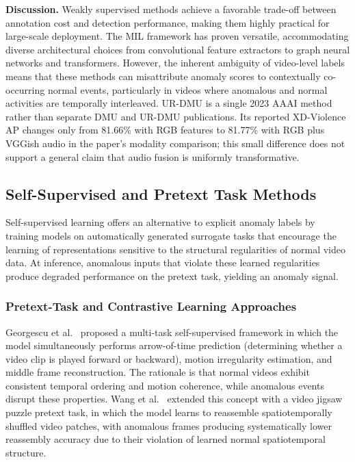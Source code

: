 \documentclass[10pt,a4paper]{article}
\begin{document}
\textbf{Discussion.} Weakly supervised methods achieve a favorable trade-off between annotation cost and detection performance, making them highly practical for large-scale deployment. The MIL framework has proven versatile, accommodating diverse architectural choices from convolutional feature extractors to graph neural networks and transformers. However, the inherent ambiguity of video-level labels means that these methods can misattribute anomaly scores to contextually co-occurring normal events, particularly in videos where anomalous and normal activities are temporally interleaved. UR-DMU is a single 2023 AAAI method rather than separate DMU and UR-DMU publications. Its reported XD-Violence AP changes only from 81.66\% with RGB features to 81.77\% with RGB plus VGGish audio in the paper's modality comparison; this small difference does not support a general claim that audio fusion is uniformly transformative.


\subsection{Self-Supervised and Pretext Task Methods}
\label{subsec:self_supervised}

Self-supervised learning offers an alternative to explicit anomaly labels by training models on automatically generated surrogate tasks that encourage the learning of representations sensitive to the structural regularities of normal video data. At inference, anomalous inputs that violate these learned regularities produce degraded performance on the pretext task, yielding an anomaly signal.

\subsubsection{Pretext-Task and Contrastive Learning Approaches}

Georgescu et al.~\citeyearpar{georgescu2021anomaly} proposed a multi-task self-supervised framework in which the model simultaneously performs arrow-of-time prediction (determining whether a video clip is played forward or backward), motion irregularity estimation, and middle frame reconstruction. The rationale is that normal videos exhibit consistent temporal ordering and motion coherence, while anomalous events disrupt these properties. Wang et al.~\citeyearpar{wang2022video_jigsaw} extended this concept with a video jigsaw puzzle pretext task, in which the model learns to reassemble spatiotemporally shuffled video patches, with anomalous frames producing systematically lower reassembly accuracy due to their violation of learned normal spatiotemporal structure.
\end{document}
